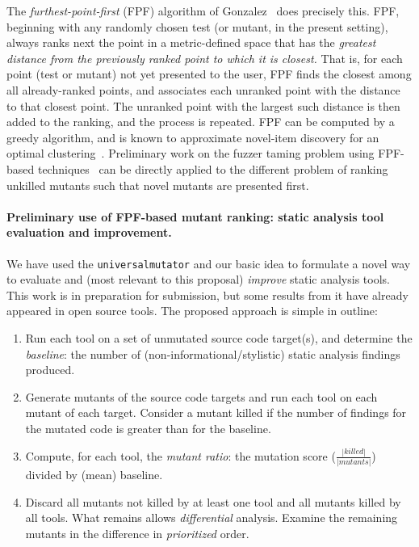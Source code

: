 The \emph{furthest-point-first} (FPF) algorithm of
Gonzalez~\cite{Gonzalez85} does precisely this.  FPF, beginning with
any randomly chosen test (or mutant, in the present setting), always ranks
next the point in a metric-defined space that has the \emph{greatest
  distance from the previously ranked point to which it is closest.}
That is, for each point (test or mutant) not yet presented to the
user, FPF finds the closest among all already-ranked points, and
associates each unranked point with the distance to that closest
point.  The unranked point with the largest such distance is then
added to the ranking, and the process is repeated.  FPF can be
computed by a greedy algorithm, and is known to approximate novel-item
discovery for an optimal clustering~\cite{Gonzalez85}.  Preliminary work on the fuzzer taming problem using FPF-based
techniques~\cite{PLDI13,distMut} can be directly applied
to the different problem of ranking
unkilled mutants such that novel mutants are presented first.  %

\paragraph{Preliminary use of FPF-based mutant ranking: static
  analysis tool evaluation and improvement.}

We have used the {\tt universalmutator} and our basic idea to
formulate a novel way to evaluate and (most relevant to this proposal)
\emph{improve} static analysis tools.  This work is in preparation for
submission, but some results from it have already appeared in open
source tools.  The proposed approach is simple in outline:

\begin{enumerate}
\item Run each tool on a set of unmutated source code target(s), and
  determine the \emph{baseline}: the number of
  (non-informational/stylistic) static analysis findings produced.
\item Generate mutants of the source code targets and run each tool on
  each mutant of each target.  Consider a mutant killed if the number
  of findings for the mutated code is greater than for the
  baseline.
\item Compute, for each tool, the \emph{mutant ratio}:  the mutation score ($\frac{|\mathit{killed}|}{|\mathit{mutants}|}$) divided by (mean) baseline. 
\item Discard all mutants not killed by at least one tool and all mutants killed by all tools.  What remains allows \emph{differential} analysis.
Examine the remaining mutants in the difference in \emph{prioritized}
order.
\end{enumerate}

